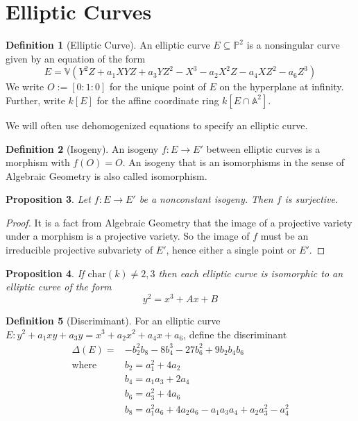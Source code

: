 \documentclass{scrartcl}
\newcommand{\V}{\mathbb{V}}
\renewcommand{\O}{O}
\newtheorem{prop}{Proposition}[section]
\theoremstyle{definition}
\newtheorem{definition}[prop]{Definition}
\begin{document}
\section{Elliptic Curves}

\begin{definition}[Elliptic Curve]
    An elliptic curve $E \subseteq \mathbb{P}^2$ is a nonsingular curve given by an equation of the form
    \begin{equation*}
        E = \V( Y^2 Z + a_1 XYZ + a_3 YZ^2 - X^3 - a_2 X^2 Z - a_4 XZ^2 - a_6 Z^3 )
    \end{equation*}
    We write $\O := [0 : 1 : 0]$ for the unique point of $E$ on the hyperplane at infinity.
    Further, write $k[E]$ for the affine coordinate ring $k[E \cap \mathbb{A}^2]$.
\end{definition}

We will often use dehomogenized equations to specify an elliptic curve.

\begin{definition}[Isogeny]
    An isogeny $f: E \to E'$ between elliptic curves is a morphism with $f(\O) = \O$.
    An isogeny that is an isomorphisms in the sense of Algebraic Geometry is also called isomorphism.
\end{definition}

\begin{prop}
    \label{prop:isogeny_surjective}
    Let $f: E \to E'$ be a nonconstant isogeny. 
    Then $f$ is surjective.
\end{prop}
\begin{proof}
    It is a fact from Algebraic Geometry that the image of a projective variety under a morphism is a projective variety.
    So the image of $f$ must be an irreducible projective subvariety of $E'$, hence either a single point or $E'$.
\end{proof}

\begin{prop}
    If $\mathrm{char}(k) \neq 2, 3$ then each elliptic curve is isomorphic to an elliptic curve of the form
    \begin{equation*}
        y^2 = x^3 + A x + B
    \end{equation*}
\end{prop}

\begin{definition}[Discriminant]
    For an elliptic curve $E: y^2 + a_1 xy + a_3 y = x^3 + a_2 x^2 + a_4 x + a_6$, define the discriminant
    \begin{align*}
        \Delta(E) = & - b_2^2 b_8 - 8 b_4^3 - 27 b_6^2 + 9 b_2 b_4 b_6 \\
        \text{where} \quad & b_2 = a_1^2 + 4 a_2 \\
        & b_4 = a_1 a_3 + 2 a_4 \\
        & b_6 = a_3^2 + 4 a_6 \\
        & b_8 = a_1^2 a_6 + 4 a_2 a_6 - a_1 a_3 a_4 + a_2 a_3^2 - a_4^2
    \end{align*}
\end{definition}
\end{document}
